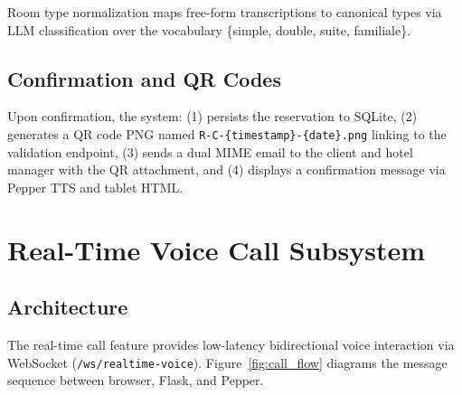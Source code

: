 \documentclass[a4paper]{article}
\begin{document}
Room type normalization maps free-form transcriptions to canonical types via LLM classification over the vocabulary \{simple, double, suite, familiale\}.

\subsection{Confirmation and QR Codes}

Upon confirmation, the system: (1) persists the reservation to SQLite, (2) generates a QR code PNG named \texttt{R-C-\{timestamp\}-\{date\}.png} linking to the validation endpoint, (3) sends a dual MIME email to the client and hotel manager with the QR attachment, and (4) displays a confirmation message via Pepper TTS and tablet HTML.

\section{Real-Time Voice Call Subsystem}

\subsection{Architecture}

The real-time call feature provides low-latency bidirectional voice interaction via WebSocket (\texttt{/ws/realtime-voice}). Figure~\ref{fig:call_flow} diagrams the message sequence between browser, Flask, and Pepper.
\end{document}

